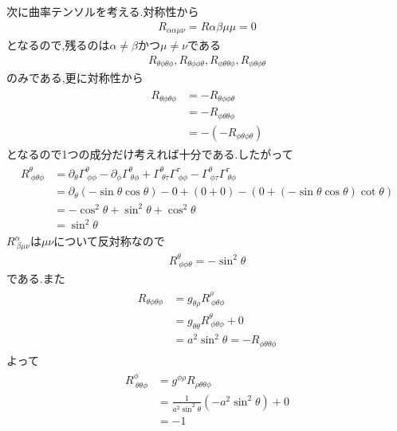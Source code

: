 \documentclass[uplatex,a4j,11pt,dvipdfmx]{jsarticle}
\begin{document}
次に曲率テンソルを考える.対称性から
\begin{align}
  R_{\alpha\alpha\mu\nu}=R{\alpha\beta\mu\mu}=0
\end{align}
となるので,残るのは$\alpha\neq\beta$かつ$\mu\neq\nu$である
\begin{align}
  R_{\theta\phi\theta\phi},R_{\theta\phi\phi\theta},R_{\phi\theta\theta\phi},R_{\phi\theta\phi\theta}
\end{align}
のみである,更に対称性から
\begin{align}
  \begin{split}
    R_{\theta\phi\theta\phi}&=-R_{\theta\phi\phi\theta}\\
    &=-R_{\phi\theta\theta\phi}\\
    &=-(-R_{\phi\theta\phi\theta})
  \end{split}
\end{align}
となるので1つの成分だけ考えれば十分である.したがって
\begin{align}
  \begin{split}
    R^\theta_{\ \phi\theta\phi}&=\partial_\theta\Gamma^{\theta}_{\ \phi\phi}
    -\partial_\phi\Gamma^\theta_{\ \theta\phi}
    +\Gamma^\theta_{\ \theta\tau}\Gamma^\tau_{\ \phi\phi}
    -\Gamma^\theta_{\ \phi\tau}\Gamma^\tau_{\ \theta\phi}\\
    &=\partial_\theta(-\sin\theta\cos\theta)-0+(0+0)-(0+(-\sin\theta\cos\theta)\cot\theta)\\
    &=-\cos^2\theta+\sin^2\theta+\cos^2\theta\\
    &=\sin^2\theta
  \end{split}
\end{align}
$R^\alpha_{\ \beta\mu\nu}$は$\mu\nu$について反対称なので
\begin{align}
  R^\theta_{\ \phi\phi\theta}=-\sin^2\theta
\end{align}
である.また
\begin{align}
  \begin{split}
    R_{\theta\phi\theta\phi}&=g_{\theta\rho}R^\rho_{\ \phi\theta\phi}\\
    &=g_{\theta\theta}R^\theta_{\ \phi\theta\phi}+0\\
    &=a^2\sin^2\theta=-R_{\phi\theta\theta\phi}
  \end{split}
\end{align}
よって
\begin{align}
  \begin{split}
    R^\phi_{\ \theta\theta\phi}&=g^{\phi\rho}R_{\rho\theta\theta\phi}\\
    &=\frac{1}{a^2\sin^2\theta}(-a^2\sin^2\theta)+0\\
    &=-1
  \end{split}
\end{align}
\end{document}
